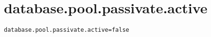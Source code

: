 \section{database.pool.passivate.active}
\label{configuration:DatabasePoolPassivateActive}
\ClearAPI
\TODO
{}
\begin{lstlisting}[style=Props,caption={Usage example for \textit{database.pool.passivate.active}}]
database.pool.passivate.active=false
\end{lstlisting}